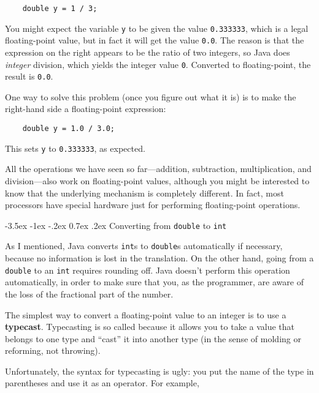 \documentclass{book}
\makeatletter
\renewcommand{\section}{\@startsection 
    {section} {1} {0mm}%
    {-3.5ex \@plus -1ex \@minus -.2ex}%
    {0.7ex \@plus.2ex}%
    {\normalfont\Large\bfseries}}
\makeatother
\begin{document}
\begin{verbatim}
    double y = 1 / 3;
\end{verbatim}
%
You might expect the variable {\tt y} to be given the value
{\tt 0.333333}, which is a legal floating-point value, but in
fact it will get the value {\tt 0.0}.  The reason is that the
expression on the right appears to be the ratio of two integers,
so Java does {\em integer} division, which yields the integer
value {\tt 0}.  Converted to floating-point, the result is
{\tt 0.0}.

One way to solve this problem (once you figure out what
it is) is to make the right-hand side a floating-point
expression:

\begin{verbatim}
    double y = 1.0 / 3.0;
\end{verbatim}
%
This sets {\tt y} to {\tt 0.333333}, as expected.


All the operations we have seen so far---addition, subtraction,
multiplication, and division---also work on floating-point values,
although you might be interested to know that the underlying mechanism
is completely different.  In fact, most processors have special
hardware just for performing floating-point operations.

\section{Converting from {\tt double} to {\tt int}}
\label{rounding}

As I mentioned, Java converts {\tt int}s
to {\tt double}s automatically if necessary, because no
information is lost in the translation.  On the other hand,
going from a {\tt double} to an {\tt int} requires rounding
off.  Java doesn't perform this operation automatically, in
order to make sure that you, as the programmer, are aware
of the loss of the fractional part of the number.

The simplest way to convert a floating-point value to an integer is to
use a {\bf typecast}.  Typecasting is so called because it allows you
to take a value that belongs to one type and ``cast'' it into another
type (in the sense of molding or reforming, not throwing).

Unfortunately, the syntax for typecasting is ugly: you put
the name of the type in parentheses and use it as an operator.
For example,
\end{document}
